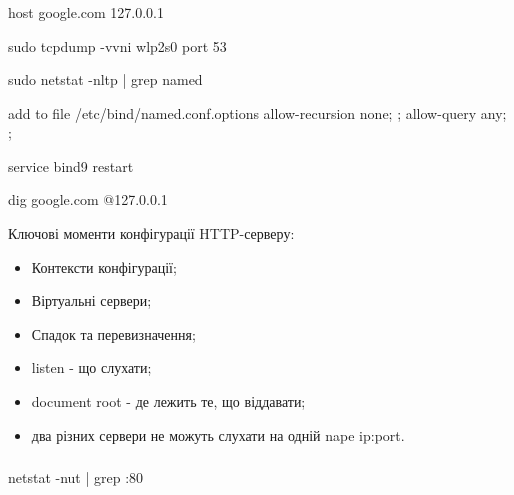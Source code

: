 \documentclass[t]{beamer}  %
\begin{document}
\begin{frame}
	\frametitle{\insertsection} 
	\framesubtitle{\insertsubsection}
host google.com 127.0.0.1

sudo tcpdump -vvni wlp2s0 port 53

sudo netstat -nltp | grep named

add to file /etc/bind/named.conf.options
        allow-recursion { none; };
        allow-query { any; };

service bind9 restart

dig google.com @127.0.0.1

Ключові моменти конфігурації HTTP-серверу:
\begin{itemize}
  \item Контексти конфігурації;
  \item Віртуальні сервери;
  \item Спадок та перевизначення;
  \item listen - що слухати;
  \item document root - де лежить те, що віддавати;
  \item два різних сервери не можуть слухати на одній nape ip:port.
\end{itemize}
\end{frame}

\begin{frame}
	\frametitle{\insertsection} 
	\framesubtitle{\insertsubsection}
netstat -nut | grep :80
\end{frame}
\end{document}
